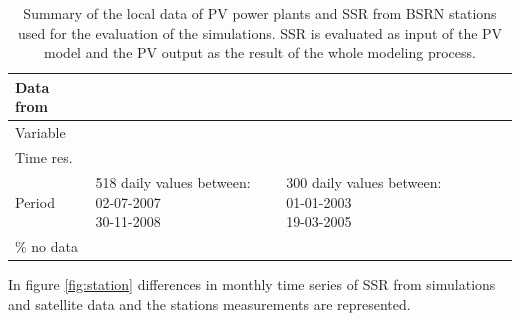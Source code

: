 \begin{table}[h!]
  \begin{tabular}{>{\raggedright}m{2cm}>{\raggedright}m{2cm}>{\raggedright}m{2cm}>{\raggedright}m{2cm}>{\raggedright}m{2cm}>{\raggedright}m{2cm}}
    \toprule 
    Data from & \centering{Seville} & \centering{Tarragona} & \centering{Payerne} &\centering{Sede Boker} &\centering{Carpentras}\tabularnewline
    \midrule
    Variable & \centering{PV productivity} & \centering{PV productivity} & \centering{SSR} & \centering{SSR} & \centering{SSR} 
\tabularnewline
    \midrule
    Time res. & \centering{day} & \centering{day} & \centering{month} & \centering{month} & \centering{month}
                    \tabularnewline
   \midrule
                                                                                            Period & \centering{518 {\small{daily values between:}} 02-07-2007\\30-11-2008} & \centering{300 {\small{daily values between:}} 01-01-2003\\19-03-2005} & \centering{2003-2009} & \centering{2003-2009} & \centering{2003-2009}
                  \tabularnewline    
 \midrule
    $\%$ no data & \centering{0} & \centering{8 $\%$} & \centering{0} & \centering{10.71 $\%$} & \centering{0}
                    \tabularnewline

 \bottomrule
  \end{tabular}
  \caption[Summary of the local PV data from power plants and SSR from BSRN stations]{Summary of the local data of PV power plants and SSR from BSRN stations used for the evaluation of the simulations. SSR is evaluated as input of the PV model and the PV output as the result of the whole modeling process.}
  \label{localData}
\end{table}

In figure \ref{fig:station} differences in monthly time series of SSR from simulations and satellite data and the stations measurements are represented.

